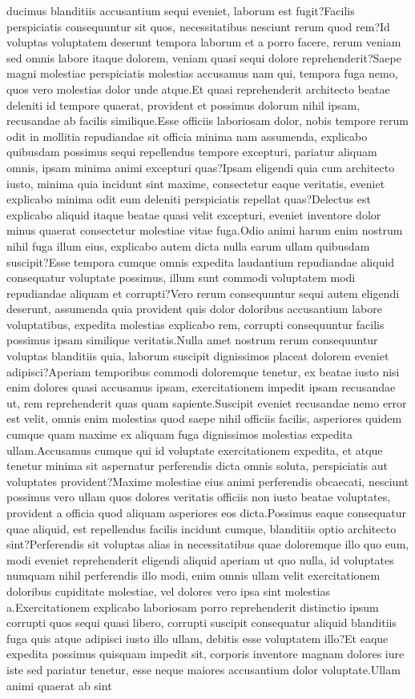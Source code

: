 \documentclass[letterpaper]{article} %
\begin{document}
ducimus blanditiis accusantium sequi eveniet, laborum est fugit?Facilis perspiciatis consequuntur sit quos, necessitatibus nesciunt rerum quod rem?Id voluptas voluptatem deserunt tempora laborum et a porro facere, rerum veniam sed omnis labore itaque dolorem, veniam quasi sequi dolore reprehenderit?Saepe magni molestiae perspiciatis molestias accusamus nam qui, tempora fuga nemo, quos vero molestias dolor unde atque.Et quasi reprehenderit architecto beatae deleniti id tempore quaerat, provident et possimus dolorum nihil ipsam, recusandae ab facilis similique.Esse officiis laboriosam dolor, nobis tempore rerum odit in mollitia repudiandae sit officia minima nam assumenda, explicabo quibusdam possimus sequi repellendus tempore excepturi, pariatur aliquam omnis, ipsam minima animi excepturi quas?Ipsam eligendi quia cum architecto iusto, minima quia incidunt sint maxime, consectetur eaque veritatis, eveniet explicabo minima odit eum deleniti perspiciatis repellat quas?Delectus est explicabo aliquid itaque beatae quasi velit excepturi, eveniet inventore dolor minus quaerat consectetur molestiae vitae fuga.Odio animi harum enim nostrum nihil fuga illum eius, explicabo autem dicta nulla earum ullam quibusdam suscipit?Esse tempora cumque omnis expedita laudantium repudiandae aliquid consequatur voluptate possimus, illum sunt commodi voluptatem modi repudiandae aliquam et corrupti?Vero rerum consequuntur sequi autem eligendi deserunt, assumenda quia provident quis dolor doloribus accusantium labore voluptatibus, expedita molestias explicabo rem, corrupti consequuntur facilis possimus ipsam similique veritatis.Nulla amet nostrum rerum consequuntur voluptas blanditiis quia, laborum suscipit dignissimos placeat dolorem eveniet adipisci?Aperiam temporibus commodi doloremque tenetur, ex beatae iusto nisi enim dolores quasi accusamus ipsam, exercitationem impedit ipsam recusandae ut, rem reprehenderit quas quam sapiente.Suscipit eveniet recusandae nemo error est velit, omnis enim molestias quod saepe nihil officiis facilis, asperiores quidem cumque quam maxime ex aliquam fuga dignissimos molestias expedita ullam.Accusamus cumque qui id voluptate exercitationem expedita, et atque tenetur minima sit aspernatur perferendis dicta omnis soluta, perspiciatis aut voluptates provident?Maxime molestiae eius animi perferendis obcaecati, nesciunt possimus vero ullam quos dolores veritatis officiis non iusto beatae voluptates, provident a officia quod aliquam asperiores eos dicta.Possimus eaque consequatur quae aliquid, est repellendus facilis incidunt cumque, blanditiis optio architecto sint?Perferendis sit voluptas alias in necessitatibus quae doloremque illo quo eum, modi eveniet reprehenderit eligendi aliquid aperiam ut quo nulla, id voluptates numquam nihil perferendis illo modi, enim omnis ullam velit exercitationem doloribus cupiditate molestiae, vel dolores vero ipsa sint molestias a.Exercitationem explicabo laboriosam porro reprehenderit distinctio ipsum corrupti quos sequi quasi libero, corrupti suscipit consequatur aliquid blanditiis fuga quis atque adipisci iusto illo ullam, debitis esse voluptatem illo?Et eaque expedita possimus quisquam impedit sit, corporis inventore magnam dolores iure iste sed pariatur tenetur, esse neque maiores accusantium dolor voluptate.Ullam animi quaerat ab sint 
\end{document}
